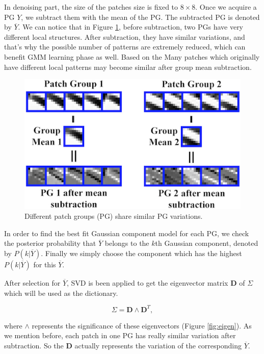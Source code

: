 In denoising part, the size of the patches size is fixed to $8\times 8$. Once we acquire a PG $Y$, we subtract them with the mean of the PG. The subtracted PG is denoted by $\overline{Y}$. We can notice that in Figure \ref{fig:subtract_pgpd_1}, before subtraction, two PGs have very different local structures. After subtraction, they have similar variations, and that's why the possible number of patterns are extremely reduced, which can benefit GMM learning phase as well. Based on the Many patches which originally have different local patterns may become similar after group mean subtraction.  

 \begin{figure}[H]
 	\centering
	\includegraphics[width=.8\linewidth]{Figures/theory_pgpd/PG_subtract.jpg}
 	\caption{Different patch groups (PG) share similar PG variations.}
 	\label{fig:subtract_pgpd_1}
 \end{figure}

In order to find the best fit Gaussian component model for each PG, we check the posterior probability that $\overline{Y}$ belongs to the $k$th Gaussian component, denoted by $P(k|\overline{Y})$. Finally we simply choose the component which has the highest $P(k|\overline{Y})$ for this $\overline{Y}$. 

After selection for $\overline{Y}$, SVD is been applied to get the eigenvector matrix $\textbf{D}$ of $\Sigma$ which will be used as the dictionary.

\begin{equation}
	\Sigma = \textbf{D} \textbf{$\wedge$} \textbf{D}^T,
	\label{eq:pgpd_1}
\end{equation}

where \textbf{$\wedge$} represents the significance of these eigenvectors (Figure \ref{fig:eigen}). As we mention before, each patch in one PG has really similar variation after subtraction. So the $\textbf{D}$ actually represents the variation of the corresponding $\overline{Y}$. 

